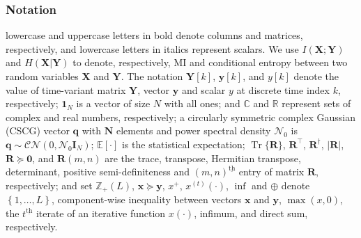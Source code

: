 \documentclass[10pt,journal]{IEEEtran}
\DeclareMathOperator{\trace}{Tr}
\newcommand{\paren}[1]{\left({#1}\right)}
\newcommand{\bracket}[1]{{\left [{#1}\right ]}}
\newcommand{\ith}[1]    {{#1}^{\underline{\text{th}}}}
\theoremstyle{definition}
\begin{document}
\subsubsection*{Notation} lowercase and uppercase letters in bold denote columns and matrices, respectively, and lowercase letters in italics represent scalars. We use $I(\mathbf{X};\mathbf{Y})$ and $H\paren{\mathbf{X}|\mathbf{Y}}$ to denote, respectively, MI and conditional entropy between two random variables $\mathbf{X}$ and $\mathbf{Y}$. The notation $\mathbf{Y}\bracket{k}$, $\mathbf{y}\bracket{k}$, and $y\bracket{k}$ denote the value of time-variant matrix $\mathbf{Y}$, vector $\mathbf{y}$ and scalar $y$ at discrete time index $k$, respectively; $\mathbf{1}_{\mathit{N}}$ is a vector of size $\mathit{N}$ with all ones; and $\mathbb{C}$ and $\mathbb{R}$ represent sets of complex and real numbers, respectively; a circularly symmetric complex Gaussian (CSCG) vector $\mathbf{q}$ with $\mathbf{N}$ elements and power spectral density $\mathcal{N}_0$ is $\mathbf{q}\sim\mathcal{CN}(0,\mathcal{N}_0\mathbf{I}_{\mathit{N}})$; $\mathbb{E}\bracket{\cdot}$ is the statistical expectation; $\trace\{\mathbf{R}\}$, $\mathbf{R}^\top$, $\mathbf{R}^\dagger$, $\left| \mathbf{R}\right|$, $\mathbf{R}\succeq\mathbf{0}$, and $\mathbf{R}\paren{m,n}$ are the trace, transpose, Hermitian transpose, determinant, positive semi-definiteness and $\ith{\paren{m,n}}$ entry of matrix $\mathbf{R}$, respectively; and set $\mathbb{Z}_{+}(L)$, $\mathbf{x}\succeq\mathbf{y}$, $x^+$, $x^{\paren{t}}\paren{\cdot}$, $\inf$ and $\oplus$ denote $\left\lbrace1,\dots,L\right\rbrace$,  component-wise inequality between vectors $\mathbf{x}$ and $\mathbf{y}$, $\max(x,0)$, the $\ith{t}$ iterate of an iterative function $x\paren{\cdot}$, infimum, and direct sum, respectively.
\end{document}
